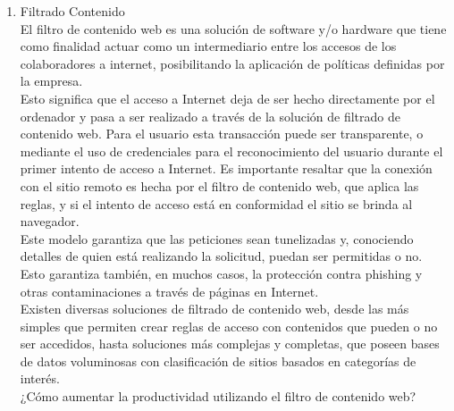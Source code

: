 \documentclass[preprint,12pt]{elsarticle}
\begin{document}
\begin{enumerate}[3.1]
    \item Filtrado Contenido \\

El filtro de contenido web es una solución de software y/o hardware que tiene como finalidad actuar como un intermediario entre los accesos de los colaboradores a internet, posibilitando la aplicación de políticas definidas por la empresa.\\

Esto significa que el acceso a Internet deja de ser hecho directamente por el ordenador y pasa a ser realizado a través de la solución de filtrado de contenido web. Para el usuario esta transacción puede ser transparente, o mediante el uso de credenciales para el reconocimiento del usuario durante el primer intento de acceso a Internet. Es importante resaltar que la conexión con el sitio remoto es hecha por el filtro de contenido web, que aplica las reglas, y si el intento de acceso está en conformidad el sitio se brinda al navegador.\\

Este modelo garantiza que las peticiones sean tunelizadas y, conociendo detalles de quien está realizando la solicitud, puedan ser permitidas o no. Esto garantiza también, en muchos casos, la protección contra phishing y otras contaminaciones a través de páginas en Internet.\\

Existen diversas soluciones de filtrado de contenido web, desde las más simples que permiten crear reglas de acceso con contenidos que pueden o no ser accedidos, hasta soluciones más complejas y completas, que poseen bases de datos voluminosas con clasificación de sitios basados en categorías de interés.\\

¿Cómo aumentar la productividad utilizando el filtro de contenido web?\\


\end{enumerate}
\end{document}
